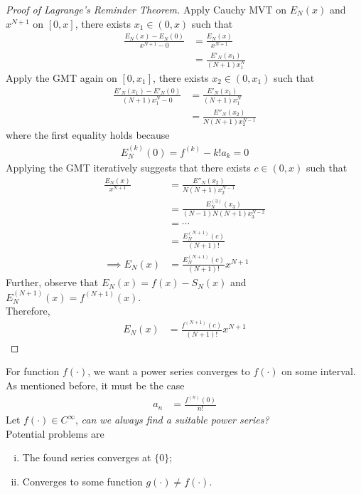 \documentclass[11pt]{article}
\begin{document}
	\begin{proof}[Proof of Lagrange's Reminder Theorem]
		Apply Cauchy MVT on $E_N(x)$ and $x^{N+1}$ on $[0, x]$, there exists $x_1 \in (0, x)$ such that
		\begin{align}
			\frac{E_N(x) - E_N(0)}{x^{N+1} - 0} 
			&= \frac{E_N(x)}{x^{N+1}} \\
			&=\frac{E'_N(x_1)}{(N+1)x_1^N}
		\end{align}
		Apply the GMT again on $[0, x_1]$, there exists $x_2 \in (0, x_1)$ such that
		\begin{align}
			\frac{E'_N(x_1) - E'_N(0)}{(N+1)x_1^N - 0}
			&= \frac{E'_N(x_1)}{(N+1)x_1^N} \\
			&= \frac{E''_N(x_2)}{N(N+1)x_2^{N-1}}
		\end{align}
		where the first equality holds because 
		\begin{align}
			E_N^{(k)}(0) = f^{(k)} - k!a_k = 0
		\end{align}
		Applying the GMT iteratively suggests that there exists $c \in (0, x)$ such that 
		\begin{align}
			\frac{E_N(x)}{x^{N+1}}
			&= \frac{E''_N(x_2)}{N(N+1)x_2^{N-1}} \\
			&= \frac{E^{(3)}_N(x_3)}{(N-1)N(N+1)x_3^{N-2}} \\
			&= \cdots \\
			&= \frac{E^{(N+1)}_N(c)}{(N+1)!} \\
			\implies E_N(x)
			&= \frac{E^{(N+1)}_N(c)}{(N+1)!} x^{N+1}
		\end{align}
		Further, observe that $E_N(x) = f(x) - S_N(x)$ and $E_N^{(N+1)}(x) = f^{(N+1)}(x)$. \\
		Therefore,
		\begin{align}
			E_N(x) &= \frac{f^{(N+1)}(c)}{(N+1)!} x^{N+1}
		\end{align}
	\end{proof}
	
	\begin{remark}
		For function $f(\cdot)$, we want a power series converges to $f(\cdot)$ on some interval. \\
		As mentioned before, it must be the case
		\begin{align}
			a_n &= \frac{f^{(n)}(0)}{n!}
		\end{align}
		Let $f(\cdot) \in C^\infty$, \emph{can we always find a suitable power series?} \\
		Potential problems are
		\begin{enumerate}[(i)]
			\item The found series converges at $\{0\}$;
			\item Converges to some function $g(\cdot) \neq f(\cdot)$.
		\end{enumerate}
	\end{remark}
	
\end{document}
